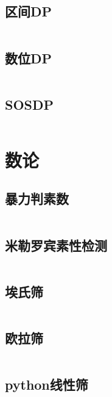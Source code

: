 \inputminted{cpp}{code/单调队列.cc}

\subsection{区间DP} 

\inputminted{cpp}{code/区间DP.cc}

\subsection{数位DP} 

\inputminted{cpp}{code/数位DP.cc}

\subsection{SOSDP} 

\inputminted{cpp}{code/SOSDP.cc}

\section{数论} 
\subsection{暴力判素数} 

\inputminted{cpp}{code/bfisprime.cc}

\subsection{米勒罗宾素性检测} 

\inputminted{cpp}{code/Miller_Rabin.cc}

\subsection{埃氏筛} 

\inputminted{cpp}{code/Eratosthenes.cc}

\subsection{欧拉筛} 

\inputminted{cpp}{code/eulerSieve.cc}

\subsection{python线性筛} 

\inputminted{py}{code/python线性筛.py}

